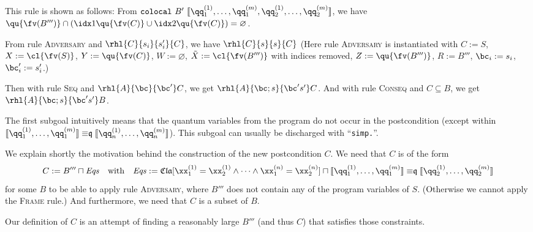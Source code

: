 \documentclass{article}
\renewcommand\refrule[1]{\hbox{\textsc{#1}} rule}
\renewcommand\ruleref[1]{rule \hbox{\textsc{#1}}}
\begin{document}
This rule is shown as follows:
From $\mathtt{colocal}\ B'\ \llbracket \qq_1^{(1)},\dots,\qq_1^{(m)},
\qq_2^{(1)},\dots,\qq_2^{(m)} \rrbracket$, we have
$\qu{\fv(B''')}\cap(\idx1 \qu{\fv(C)}\cup\idx2\qu{\fv(C)})=\varnothing$.

From \ruleref{Adversary} and $\rhl{C}{s_i}{s_i'}{C}$, we have $\rhl{C}{s}{s}{C}$
(Here \ruleref{Adversary} is instantiated with $C:=S$, $X:=\cl{\fv(S)}$, $Y:=\qu{\fv(C)}$,
$W:=\varnothing$, $\Tilde X:=\cl{\fv(B''')}$ with indices removed,
$Z:=\qu{\fv(B''')}$, $R:=B'''$, $\bc_i:=s_i$, $\bc'_i:=s'_i$.)

Then with \ruleref{Seq} and $\rhl{A}{\bc}{\bc'}C$, we get 
$\rhl{A}{\bc;s}{\bc's'}C$. And with \ruleref{Conseq} and $C\subseteq B$,
we get $\rhl{A}{\bc;s}{\bc's'}B$.


The first subgoal intuitively means that the quantum variables from
the program do not occur in the postcondition (except within
$\llbracket \qq_1^{(1)},\dots,\qq_1^{(m)} \rrbracket
\mathrel{\mathord\equiv\mathfrak q} \llbracket
\qq_n^{(1)},\dots,\qq_n^{(m)} \rrbracket$). This subgoal can usually
be discharged with ``\texttt{simp.}''.

\medskip

We explain shortly the motivation behind the construction of the new
postcondition $C$.
We need that $C$ is of the form
\[
  C:=B'''\sqcap\mathit{Eqs}
  \quad\text{with}\quad
  \mathit{Eqs} := \mathfrak{Cla}[\xx^{(1)}_1=\xx^{(1)}_2\land\dots\land
\xx^{(n)}_1=\xx^{(n)}_2]\sqcap\llbracket \qq_1^{(1)},\dots,\qq_1^{(m)}
\rrbracket \mathrel{\mathord\equiv\mathfrak q} \llbracket
\qq_2^{(1)},\dots,\qq_2^{(m)} \rrbracket
\]
for some $B$ to be able to apply \ruleref{Adversary}, where $B'''$
does not contain any of the program variables of $S$.
(Otherwise we cannot apply the \refrule{Frame}.) And furthermore, we
need that $C$
is a subset of $B$.  

Our definition of $C$
is an attempt of finding a reasonably large $B'''$
(and thus $C$) that satisfies those constraints.
\end{document}
